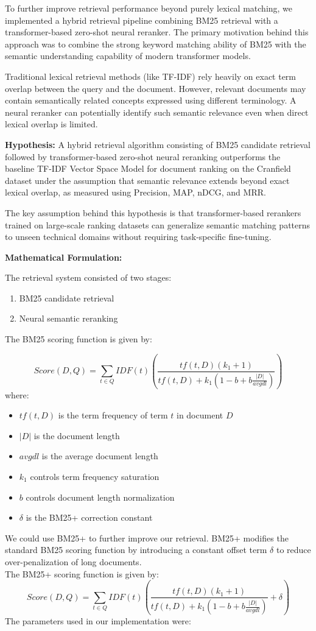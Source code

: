 \documentclass{article}
\begin{document}
To further improve retrieval performance beyond purely lexical matching, we implemented a hybrid retrieval pipeline combining BM25 retrieval with a transformer-based zero-shot neural reranker. The primary motivation behind this approach was to combine the strong keyword matching ability of BM25 with the semantic understanding capability of modern transformer models.

Traditional lexical retrieval methods (like TF-IDF) rely heavily on exact term overlap between the query and the document. However, relevant documents may contain semantically related concepts expressed using different terminology. A neural reranker can potentially identify such semantic relevance even when direct lexical overlap is limited.

\textbf{Hypothesis:} A hybrid retrieval algorithm consisting of BM25 candidate retrieval followed by transformer-based zero-shot neural reranking outperforms the baseline TF-IDF Vector Space Model for document ranking on the Cranfield dataset under the assumption that semantic relevance extends beyond exact lexical overlap, as measured using Precision, MAP, nDCG, and MRR.

The key assumption behind this hypothesis is that transformer-based rerankers trained on large-scale ranking datasets can generalize semantic matching patterns to unseen technical domains without requiring task-specific fine-tuning.

\textbf{Mathematical Formulation:}

The retrieval system consisted of two stages:

\begin{enumerate}
    \item BM25 candidate retrieval
    \item Neural semantic reranking
\end{enumerate}
The BM25 scoring function is given by:

\[
Score(D,Q)=\sum_{t \in Q} IDF(t)
\left(
\frac{tf(t,D)(k_1+1)}
{tf(t,D)+k_1(1-b+b\frac{|D|}{avgdl})}
\right)
\]
where:

\begin{itemize}
    \item $tf(t,D)$ is the term frequency of term $t$ in document $D$
    \item $|D|$ is the document length
    \item $avgdl$ is the average document length
    \item $k_1$ controls term frequency saturation
    \item $b$ controls document length normalization
    \item $\delta$ is the BM25+ correction constant
\end{itemize}
We could use BM25+ to further improve our retrieval. BM25+ modifies the standard BM25 scoring function by introducing a constant offset term $\delta$ to reduce over-penalization of long documents.\\
The BM25+ scoring function is given by:
\[
Score(D,Q)=\sum_{t \in Q} IDF(t)
\left(
\frac{tf(t,D)(k_1+1)}
{tf(t,D)+k_1(1-b+b\frac{|D|}{avgdl})}
+\delta
\right)
\]
The parameters used in our implementation were:
\end{document}
